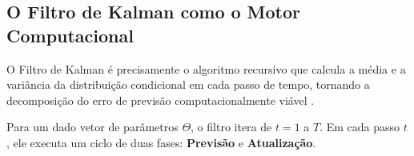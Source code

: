 \documentclass[ 12pt,a4paper ]{article} %
\begin{document}
	\subsection{O Filtro de Kalman como o Motor Computacional}
	
	O Filtro de Kalman é precisamente o algoritmo recursivo que calcula a média e a variância da distribuição condicional em cada passo de tempo, tornando a decomposição do erro de previsão computacionalmente viável \cite{Becker}.
	
	Para um dado vetor de parâmetros $\Theta$, o filtro itera de $t=1$ a $T$. Em cada passo $t$, ele executa um ciclo de duas fases: \textbf{Previsão} e \textbf{Atualização}.
	
	
\end{document}
